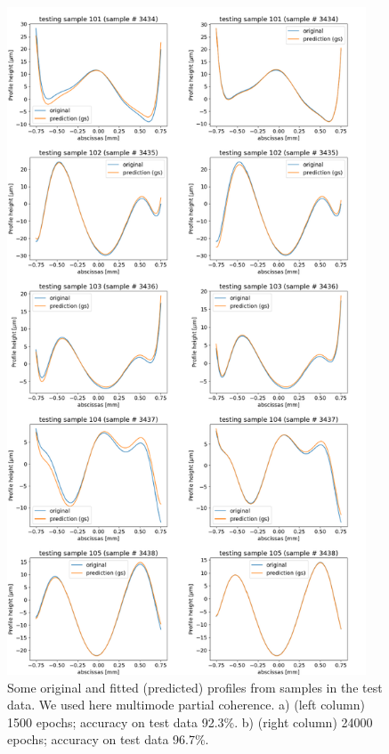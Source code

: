 \documentclass{iucr}
\begin{document}
\begin{figure}\label{fig:multimode}
\includegraphics[width=0.95\textwidth]{figures/figure_multimode.pdf}




\caption{
Some original and fitted (predicted) profiles from samples in the test data. We used here multimode partial coherence.
a) (left column) 1500 epochs;
accuracy on test data 92.3\%. 
b) (right column) 24000 epochs;
accuracy on test data 96.7\%.
    }
\end{figure}
\end{document}
